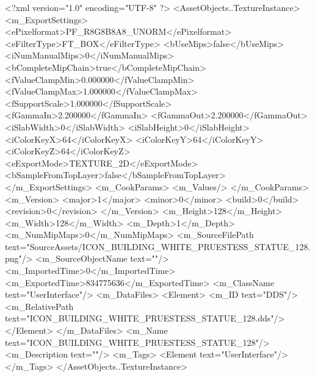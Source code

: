 <?xml version="1.0" encoding="UTF-8" ?>
<AssetObjects..TextureInstance>
	<m_ExportSettings>
		<ePixelformat>PF_R8G8B8A8_UNORM</ePixelformat>
		<eFilterType>FT_BOX</eFilterType>
		<bUseMips>false</bUseMips>
		<iNumManualMips>0</iNumManualMips>
		<bCompleteMipChain>true</bCompleteMipChain>
		<fValueClampMin>0.000000</fValueClampMin>
		<fValueClampMax>1.000000</fValueClampMax>
		<fSupportScale>1.000000</fSupportScale>
		<fGammaIn>2.200000</fGammaIn>
		<fGammaOut>2.200000</fGammaOut>
		<iSlabWidth>0</iSlabWidth>
		<iSlabHeight>0</iSlabHeight>
		<iColorKeyX>64</iColorKeyX>
		<iColorKeyY>64</iColorKeyY>
		<iColorKeyZ>64</iColorKeyZ>
		<eExportMode>TEXTURE_2D</eExportMode>
		<bSampleFromTopLayer>false</bSampleFromTopLayer>
	</m_ExportSettings>
	<m_CookParams>
		<m_Values/>
	</m_CookParams>
	<m_Version>
		<major>1</major>
		<minor>0</minor>
		<build>0</build>
		<revision>0</revision>
	</m_Version>
	<m_Height>128</m_Height>
	<m_Width>128</m_Width>
	<m_Depth>1</m_Depth>
	<m_NumMipMaps>0</m_NumMipMaps>
	<m_SourceFilePath text="SourceAssets/ICON_BUILDING_WHITE_PRUESTESS_STATUE_128.png"/>
	<m_SourceObjectName text=""/>
	<m_ImportedTime>0</m_ImportedTime>
	<m_ExportedTime>834775636</m_ExportedTime>
	<m_ClassName text="UserInterface"/>
	<m_DataFiles>
		<Element>
			<m_ID text="DDS"/>
			<m_RelativePath text="ICON_BUILDING_WHITE_PRUESTESS_STATUE_128.dds"/>
		</Element>
	</m_DataFiles>
	<m_Name text="ICON_BUILDING_WHITE_PRUESTESS_STATUE_128"/>
	<m_Description text=""/>
	<m_Tags>
		<Element text="UserInterface"/>
	</m_Tags>
</AssetObjects..TextureInstance>

